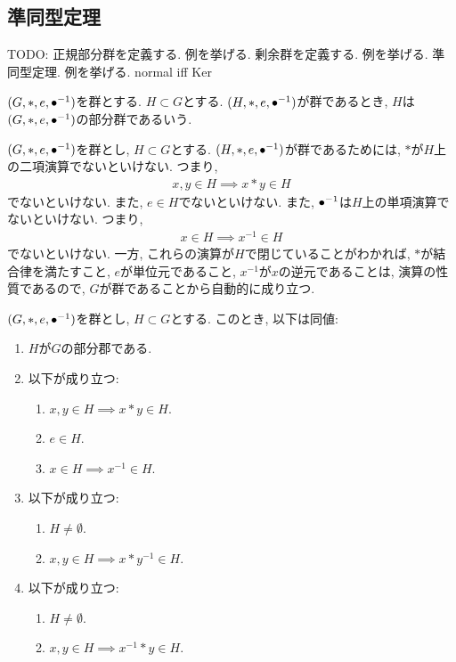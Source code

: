 \subsection{準同型定理}
TODO:
 正規部分群を定義する.
 例を挙げる.
 剰余群を定義する.
 例を挙げる.
 準同型定理.
 例を挙げる.
 normal iff Ker


\begin{definition}
  $(G,\ast,e,{\bullet}^{-1})$を群とする.
  $H\subset G$とする.
  $(H,\ast,e,{\bullet}^{-1})$が群であるとき,
  $H$は$(G,\ast,e,{\bullet}^{-1})$の部分群であるいう.
\end{definition}
\begin{remark}
  $(G,\ast,e,{\bullet}^{-1})$を群とし,
  $H\subset G$とする.
  $(H,\ast,e,{\bullet}^{-1})$が群であるためには,
  $\ast$が$H$上の二項演算でないといけない.
  つまり,
  \begin{align*}
    x,y\in H \implies x\ast y\in H
  \end{align*}
  でないといけない.
  また, $e\in H$でないといけない.
  また, ${\bullet}^{-1}$は$H$上の単項演算でないといけない.
  つまり,
  \begin{align*}
    x\in H \implies x^{-1}\in H
  \end{align*}
  でないといけない.
  一方, これらの演算が$H$で閉じていることがわかれば,
  $\ast$が結合律を満たすこと,
  $e$が単位元であること,
  $x^{-1}$が$x$の逆元であることは,
  演算の性質であるので, $G$が群であることから自動的に成り立つ.
\end{remark}
\begin{prop}
  $(G,\ast,e,{\bullet}^{-1})$を群とし,
  $H\subset G$とする.
  このとき, 以下は同値:
  \begin{enumerate}
  \item $H$が$G$の部分郡である.
  \item 以下が成り立つ:
    \begin{enumerate}
    \item $x,y \in H \implies x\ast y \in H$.
    \item $e\in H$.
    \item $x \in H \implies x^{-1} \in H$.
    \end{enumerate}
  \item 以下が成り立つ:
    \begin{enumerate}
    \item $H\neq \emptyset$.
    \item $x,y \in H \implies x\ast y^{-1} \in H$.
    \end{enumerate}
  \item 以下が成り立つ:
    \begin{enumerate}
    \item $H\neq \emptyset$.
    \item $x,y \in H \implies x^{-1}\ast y \in H$.
    \end{enumerate}
  \end{enumerate}
\end{prop}

